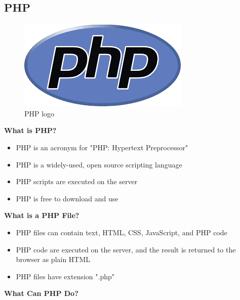 \subsection{PHP}
\begin{figure}[h!]
\centering \includegraphics[scale=0.50]{images/php.png}
\caption{PHP logo}
\end{figure}
 {\bf What is PHP?}
\begin{itemize}
   \item  PHP is an acronym for "PHP: Hypertext Preprocessor"
    \item PHP is a widely-used, open source scripting language
     \item PHP scripts are executed on the server
     \item  PHP is free to download and use\\
\end{itemize}
 {\bf What is a PHP File?}
\begin{itemize}
     \item PHP files can contain text, HTML, CSS, JavaScript, and PHP code
    \item PHP code are executed on the server, and the result is returned to the browser as plain HTML
    \item  PHP files have extension ".php"\\
\end{itemize}
 {\bf What Can PHP Do?}

